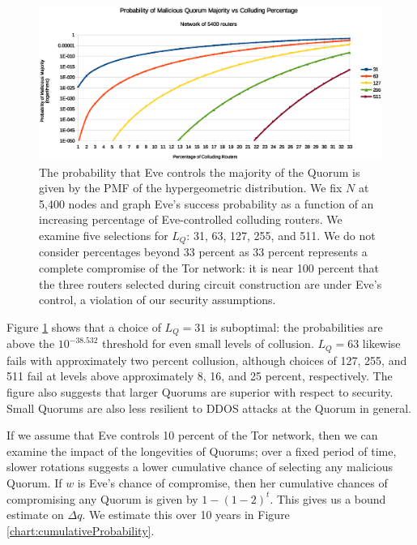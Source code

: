 \documentclass{sig-alternate}
\begin{document}
\begin{figure}[h]
	\centering
	\includegraphics[width=\linewidth]{../analysis/MaliciousQuorumProbability.eps}
	\caption{The probability that Eve controls the majority of the Quorum is given by the PMF of the hypergeometric distribution. We fix $ N $ at 5,400 nodes and graph Eve's success probability as a function of an increasing percentage of Eve-controlled colluding routers. We examine five selections for $ L_{Q} $: 31, 63, 127, 255, and 511. We do not consider percentages beyond 33 percent as 33 percent represents a complete compromise of the Tor network: it is near 100 percent that the three routers selected during circuit construction are under Eve's control, a violation of our security assumptions.}
	\label{chart:quorumMajority}
\end{figure}

Figure \ref{chart:quorumMajority} shows that a choice of $ L_{Q} = 31 $ is suboptimal: the probabilities are above the $ 10^{-38.532} $ threshold for even small levels of collusion. $ L_{Q} = 63 $ likewise fails with approximately two percent collusion, although choices of 127, 255, and 511 fail at levels above approximately 8, 16, and 25 percent, respectively. The figure also suggests that larger Quorums are superior with respect to security. Small Quorums are also less resilient to DDOS attacks at the Quorum in general.

If we assume that Eve controls 10 percent of the Tor network, then we can examine the impact of the longevities of Quorums; over a fixed period of time, slower rotations suggests a lower cumulative chance of selecting any malicious Quorum. If $ w $ is Eve's chance of compromise, then her cumulative chances of compromising any Quorum is given by $ 1 - (1-2)^t $. This gives us a bound estimate on $ \Delta q $. We estimate this over 10 years in Figure \ref{chart:cumulativeProbability}.
\end{document}
